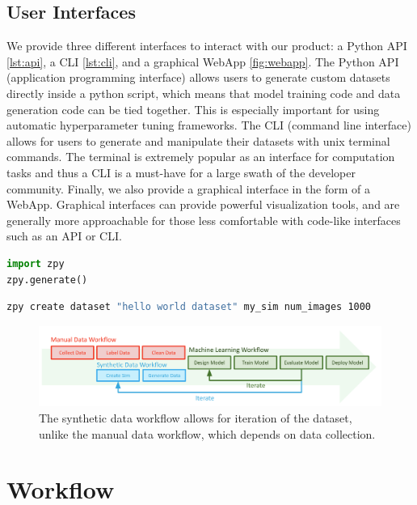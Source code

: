 \documentclass{article}
\begin{document}
\subsection{User Interfaces}
\label{sec:userinterfaces}

We provide three different interfaces to interact with our product: a Python API \ref{lst:api}, a CLI \ref{lst:cli}, and a graphical WebApp \ref{fig:webapp}. The Python API (application programming interface) allows users to generate custom datasets directly inside a python script, which means that model training code and data generation code can be tied together. This is especially important for using automatic hyperparameter tuning frameworks. The CLI (command line interface) allows for users to generate and manipulate their datasets with unix terminal commands. The terminal is extremely popular as an interface for computation tasks and thus a CLI is a must-have for a large swath of the developer community. Finally, we also provide a graphical interface in the form of a WebApp. Graphical interfaces can provide powerful visualization tools, and are generally more approachable for those less comfortable with code-like interfaces such as an API or CLI. 

\begin{lstlisting}[language=Python,caption={Generating a dataset using the zpy python API.},label={lst:api}]
import zpy
zpy.generate()
\end{lstlisting}

\begin{lstlisting}[language=bash,caption={Generating a dataset using the zpy CLI},label={lst:cli}]
zpy create dataset "hello world dataset" my_sim num_images 1000
\end{lstlisting}

\begin{figure}
	\centering
	\includegraphics[width=\textwidth]{workflow.png}
	\caption{The synthetic data workflow allows for iteration of the dataset, unlike the manual data workflow, which depends on data collection.}
	\label{fig:workflow}
\end{figure}

\section{Workflow}
\label{sec:workflow}
\end{document}
